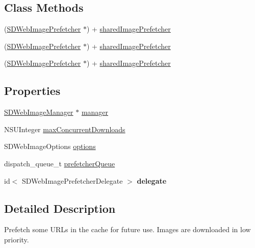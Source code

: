 \subsection*{Class Methods}
\begin{DoxyCompactItemize}
\item 
(\mbox{\hyperlink{interface_s_d_web_image_prefetcher}{S\+D\+Web\+Image\+Prefetcher}} $\ast$) + \mbox{\hyperlink{interface_s_d_web_image_prefetcher_a68ffcf7977763c9c253742f092c424a5}{shared\+Image\+Prefetcher}}
\item 
(\mbox{\hyperlink{interface_s_d_web_image_prefetcher}{S\+D\+Web\+Image\+Prefetcher}} $\ast$) + \mbox{\hyperlink{interface_s_d_web_image_prefetcher_a68ffcf7977763c9c253742f092c424a5}{shared\+Image\+Prefetcher}}
\item 
(\mbox{\hyperlink{interface_s_d_web_image_prefetcher}{S\+D\+Web\+Image\+Prefetcher}} $\ast$) + \mbox{\hyperlink{interface_s_d_web_image_prefetcher_a68ffcf7977763c9c253742f092c424a5}{shared\+Image\+Prefetcher}}
\end{DoxyCompactItemize}
\subsection*{Properties}
\begin{DoxyCompactItemize}
\item 
\mbox{\hyperlink{interface_s_d_web_image_manager}{S\+D\+Web\+Image\+Manager}} $\ast$ \mbox{\hyperlink{interface_s_d_web_image_prefetcher_a859de83b8f3c745d937d33f5abc3ec64}{manager}}
\item 
N\+S\+U\+Integer \mbox{\hyperlink{interface_s_d_web_image_prefetcher_a9dd137551c61f4f73f636bf21eb23e7d}{max\+Concurrent\+Downloads}}
\item 
S\+D\+Web\+Image\+Options \mbox{\hyperlink{interface_s_d_web_image_prefetcher_afdc1313a083c12e78cecebfcf22eeb8f}{options}}
\item 
dispatch\+\_\+queue\+\_\+t \mbox{\hyperlink{interface_s_d_web_image_prefetcher_a8022c3037744d6a740df2af0b67f927b}{prefetcher\+Queue}}
\item 
\mbox{\label{interface_s_d_web_image_prefetcher_a80c4f922feb5bea31b97a619a7a3d64d}} 
id$<$ S\+D\+Web\+Image\+Prefetcher\+Delegate $>$ {\bfseries delegate}
\end{DoxyCompactItemize}


\subsection{Detailed Description}
Prefetch some U\+R\+Ls in the cache for future use. Images are downloaded in low priority. 

